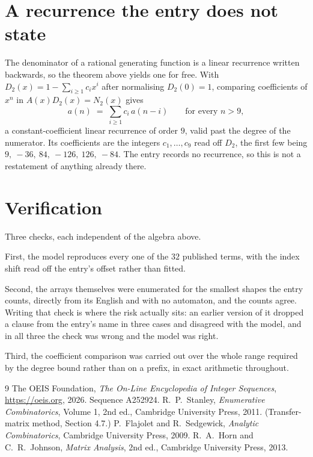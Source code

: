 \documentclass[11pt,a4paper]{article}
\theoremstyle{plain}
\theoremstyle{definition}
\begin{document}
\section{A recurrence the entry does not state}

The denominator of a rational generating function is a linear recurrence written backwards, so
the theorem above yields one for free. With $D_2(x)=1-\sum_{i\ge1}c_ix^i$ after normalising
$D_2(0)=1$, comparing coefficients of $x^n$ in $A(x)D_2(x)=N_2(x)$ gives
\[
a(n)\;=\;\sum_{i\ge1}c_i\,a(n-i)\qquad\text{for every }n>9,
\]
a constant-coefficient linear recurrence of order $9$, valid past the degree of the
numerator. Its coefficients are the integers $c_1,\dots,c_{9}$ read off $D_2$, the first few being $9,\ -36,\ 84,\ -126,\ 126,\ -84$. The entry records no recurrence, so this is not a restatement of anything
already there.

\section{Verification}

Three checks, each independent of the algebra above.

First, the model reproduces every one of the $32$ published terms, with the index shift
read off the entry's offset rather than fitted.

Second, the arrays themselves were enumerated for the smallest shapes the entry counts,
directly from its English and with no automaton, and the counts agree. Writing that check is
where the risk actually sits: an earlier version of it dropped a clause from the entry's name
in three cases and disagreed with the model, and in all three the check was wrong and the model
was right.

Third, the coefficient comparison was carried out over the whole range required by the degree
bound rather than on a prefix, in exact arithmetic throughout.

\begin{thebibliography}{9}
 The OEIS Foundation, \emph{The On-Line Encyclopedia of Integer
Sequences}, \url{https://oeis.org}, 2026. Sequence A252924.
 R.~P.~Stanley, \emph{Enumerative Combinatorics}, Volume 1, 2nd ed.,
Cambridge University Press, 2011. (Transfer-matrix method, Section 4.7.)
 P.~Flajolet and R.~Sedgewick, \emph{Analytic Combinatorics}, Cambridge
University Press, 2009.
 R.~A.~Horn and C.~R.~Johnson, \emph{Matrix Analysis}, 2nd ed., Cambridge
University Press, 2013.
\end{thebibliography}
\end{document}
